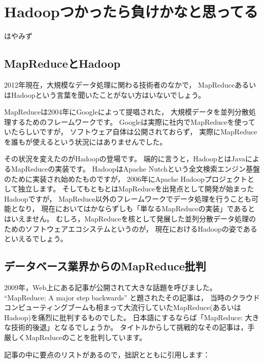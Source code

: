 
\chapter{Hadoopつかったら負けかなと思ってる}

\begin{flushright}
 {\headfont はやみず}
\end{flushright}

\section{MapReduceとHadoop}

2012年現在，大規模なデータ処理に関わる技術者のなかで，
MapReduceあるいはHadoopという言葉を聞いたことがない方はいないでしょう。

MapReduceは2004年にGoogleによって提唱された，
大規模データを並列分散処理するためのフレームワークです。
Googleは実際に社内でMapReduceを使っていたらしいですが，
ソフトウェア自体は公開されておらず，
実際にMapReduceを誰もが使えるという状況にはありませんでした。

その状況を変えたのがHadoopの登場です。
端的に言うと，HadoopとはJavaによるMapReduceの実装です。
HadoopはApache Nutchという全文検索エンジン基盤のために実装され始めたものですが，
2006年にApache Hadoopプロジェクトとして独立します。
そしてもともとはMapReduceを出発点として開発が始まったHadoopですが，
MapReduce以外のフレームワークでデータ処理を行うことも可能となり，
現在においてはかならずしも「単なるMapReduceの実装」であるとはいえません。
むしろ，MapReduceを核として発展した並列分散データ処理のためのソフトウェアエコシステムというのが，
現在におけるHadoopの姿であるといえるでしょう。

\section{データベース業界からのMapReduce批判}

2009年，Web上にある記事が公開されて大きな話題を呼びました。
``MapReduce: A major step backwards'' と題されたその記事は，
当時のクラウドコンピューティングブームも相まって大流行していたMapReduce(あるいはHadoop)を痛烈に批判するものでした。
日本語にするならば「MapReduce: 大きな技術的後退」となるでしょうか。
タイトルからして挑戦的なその記事は，手厳しくMapReduceのことを批判しています。

記事の中に要点のリストがあるので，拙訳とともに引用します：

